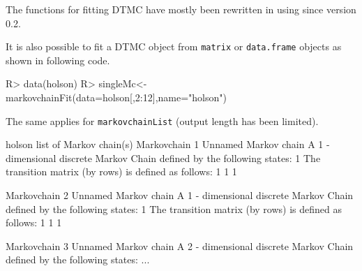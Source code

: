 \documentclass[
  nojss]{jss}
\begin{document}
\begin{CodeChunk}


\end{CodeChunk}

The functions for fitting DTMC have mostly been rewritten in  using  \cite{RcppR} since version 0.2.

It is also possible to fit a DTMC object from \texttt{matrix} or \texttt{data.frame} objects as shown in following code.

\begin{CodeChunk}

\begin{CodeInput}
R> data(holson)
R> singleMc<-markovchainFit(data=holson[,2:12],name="holson")
\end{CodeInput}
\end{CodeChunk}

The same applies for \texttt{markovchainList} (output length has been limited).

\begin{CodeChunk}


\begin{CodeOutput}
holson  list of Markov chain(s) 
Markovchain  1 
Unnamed Markov chain 
 A  1 - dimensional discrete Markov Chain defined by the following states: 
 1 
 The transition matrix  (by rows)  is defined as follows: 
  1
1 1

Markovchain  2 
Unnamed Markov chain 
 A  1 - dimensional discrete Markov Chain defined by the following states: 
 1 
 The transition matrix  (by rows)  is defined as follows: 
  1
1 1

Markovchain  3 
Unnamed Markov chain 
 A  2 - dimensional discrete Markov Chain defined by the following states: 
...
\end{CodeOutput}
\end{CodeChunk}
\end{document}
